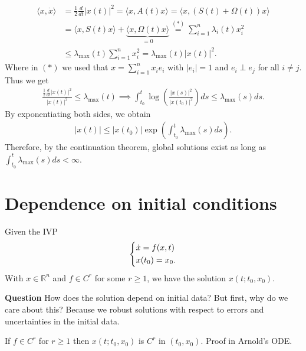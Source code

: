 \begin{ex}
\begin{align}
	\langle x, \dot{x} \rangle &= \frac{1}{2} \frac{d}{dt} |x(t)|^2 = \langle x, A(t) x\rangle = \langle x, (S(t) + \Omega(t) ) x \rangle \\
				   &= \langle x, S(t) x \rangle + \underbrace{\langle x, \Omega(t) x \rangle}_{=0} \stackrel{(*)}{=} 
				   \sum_{i=1}^{n} \lambda_i(t) x_i^2 \\
				   &\leq \lambda_{ \textrm{max} }(t) \sum_{i=1}^{n} x_i^2 = \lambda _{ \textrm{max} }(t) | x(t)|^2.
\end{align}
Where in $(*)$ we used that $x = \sum_{i=1}^{n} x_i e_i $ with $|e_i|=1$ and $e_i \perp e_j$ for all $i \neq j$. Thus we get
\begin{align}
	\frac{\frac{1}{2}\frac{d}{dt}|x(t)|^2}{|x(t)|^2} \leq \lambda_{ \textrm{max} }(t) 
	\implies \int_{t_0}^{t} \log \left( \frac{|x(s)|^2}{|x(t_0)|^2} \right) ds \leq \lambda _{ \textrm{max} }(s) ds.
\end{align}
By exponentiating both sides, we obtain
\begin{align}
\boxed{ |x(t)| \leq |x(t_0) | \exp\left(\int_{t_0}^{t} \lambda_{ \textrm{max} }(s)ds\right).}
\end{align}
Therefore, by the continuation theorem, global solutions exist as long as $\int_{t_0}^{t} \lambda_{ \textrm{max} }(s) ds < \infty $.
\end{ex}

\section{Dependence on initial conditions}
Given the IVP
\begin{align}
	\begin{dcases}
	\dot{x} = f(x,t) \\ x(t_0) = x_0.
	\end{dcases}
\end{align}
With $x \in \mathbb{R}^{n}$ and $f\in C^r$ for some $r\geq 1$, we have the solution $x(t; t_0, x_0)$.

\textbf{Question} How does the solution depend on initial data?
But first, why do we care about this? Because we robust solutions with respect to errors and uncertainties in the initial data.
\begin{theorem}[]
	If $f \in C^r$ for $r\geq 1$ then $x(t; t_0, x_0)$ is $C^r$ in $(t_0, x_0)$. Proof in Arnold's ODE.
\end{theorem}

